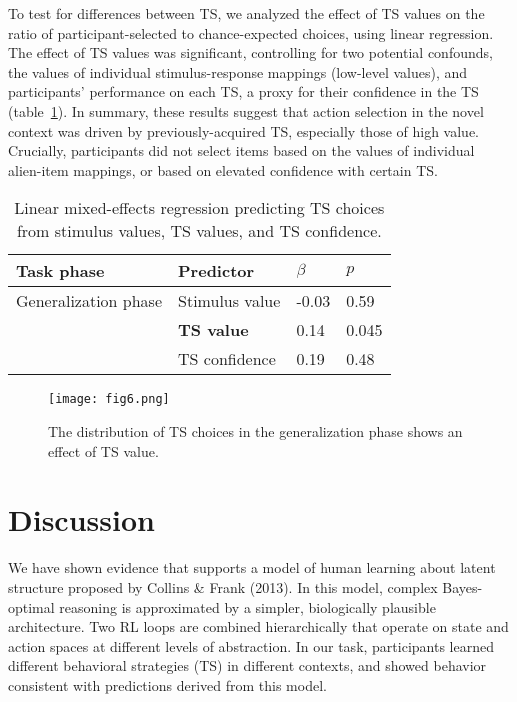 \documentclass[10pt, letterpaper]{article}
\begin{document}
To test for differences between TS, we analyzed the effect of TS values on the ratio of participant-selected to chance-expected choices, using linear regression. The effect of TS values was significant, controlling for two potential confounds, the values of individual stimulus-response mappings (low-level values), and participants' performance on each TS, a proxy for their confidence in the TS (table~\ref{table:TS creation}). In summary, these results suggest that action selection in the novel context was driven by previously-acquired TS, especially those of high value. Crucially, participants did not select items based on the values of individual alien-item mappings, or based on elevated confidence with certain TS. 

\begin{table}[!ht]
\begin{center} 
\caption{Linear mixed-effects regression predicting TS choices from stimulus values, TS values, and TS confidence.} 
\label{table:TS creation} 
\vskip 0.1in
\small{
\begin{tabular}{llll} 
\hline
Task phase          &   Predictor               &   $\beta$ &   $p$   \\
\hline
Generalization phase&   Stimulus value          &   -0.03   &   0.59  \\
                    &   {\bf TS value}          &   0.14    &   0.045 \\
                    &   TS confidence           &   0.19    &   0.48  \\
\hline
\end{tabular}
}
\end{center} 
\end{table}

\begin{figure}[ht]
    \begin{center}
	\texttt{[image: fig6.png]}
    \end{center}
    \caption{The distribution of TS choices in the generalization phase shows an effect of TS value.}
    \label{figure:TS creation distribution}
\end{figure}

\section{Discussion}

We have shown evidence that supports a model of human learning about latent structure proposed by Collins \& Frank (2013). In this model, complex Bayes-optimal reasoning is approximated by a simpler, biologically plausible architecture. Two RL loops are combined hierarchically that operate on state and action spaces at different levels of abstraction. In our task, participants learned different behavioral strategies (TS) in different contexts, and showed behavior consistent with predictions derived from this model.
\end{document}
